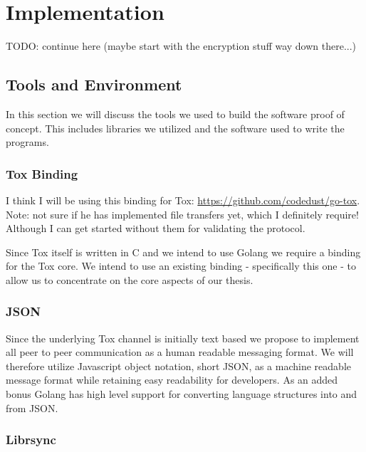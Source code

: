 \chapter{Implementation}
\label{chap:Implementation}

TODO: continue here (maybe start with the encryption stuff way down there...)

\section{Tools and Environment}
\label{sec:Tools and Environment}

In this section we will discuss the tools we used to build the software proof of concept.
This includes libraries we utilized and the software used to write the programs.

\subsection{Tox Binding}
\label{sub:Tox Binding}

I think I will be using this binding for Tox: \url{https://github.com/codedust/go-tox}.
Note: not sure if he has implemented file transfers yet, which I definitely require!
Although I can get started without them for validating the protocol.

Since Tox itself is written in C and we intend to use Golang we require a binding for the Tox core.
We intend to use an existing binding - specifically this one \cite{web:site:tox:golang} - to allow us to concentrate on the core aspects of our thesis.

\subsection{JSON}
\label{sub:JSON}

Since the underlying Tox channel is initially text based we propose to implement all peer to peer communication as a human readable messaging format.
We will therefore utilize Javascript object notation, short JSON, as a machine readable message format while retaining easy readability for developers.
As an added bonus Golang has high level support for converting language structures into and from JSON.

\subsection{Librsync}

